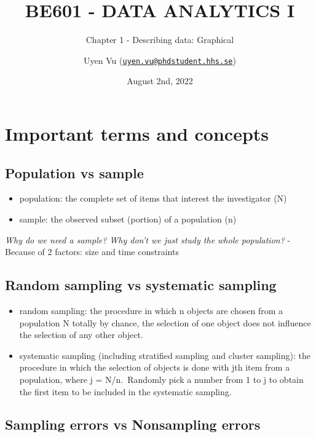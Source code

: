 \documentclass[
]{article}
\title{BE601 - DATA ANALYTICS I}
\subtitle{Chapter 1 - Describing data: Graphical}
\author{Uyen Vu
(\href{mailto:uyen.vu@phdstudent.hhs.se}{\nolinkurl{uyen.vu@phdstudent.hhs.se}})}
\date{August 2nd, 2022}
\providecommand{\tightlist}{%
  \setlength{\itemsep}{0pt}\setlength{\parskip}{0pt}}
\begin{document}
\maketitle

\newpage

\hypertarget{important-terms-and-concepts}{%
\section{Important terms and
concepts}\label{important-terms-and-concepts}}

\hypertarget{population-vs-sample}{%
\subsection{Population vs sample}\label{population-vs-sample}}

\begin{itemize}
\tightlist
\item
  population: the complete set of items that interest the investigator
  (N)
\item
  sample: the observed subset (portion) of a population (n)
\end{itemize}

\emph{Why do we need a sample? Why don't we just study the whole
population?} - Because of 2 factors: size and time constraints

\hypertarget{random-sampling-vs-systematic-sampling}{%
\subsection{Random sampling vs systematic
sampling}\label{random-sampling-vs-systematic-sampling}}

\begin{itemize}
\tightlist
\item
  random sampling: the procedure in which n objects are chosen from a
  population N totally by chance, the selection of one object does not
  influence the selection of any other object.
\item
  systematic sampling (including stratified sampling and cluster
  sampling): the procedure in which the selection of objects is done
  with jth item from a population, where j = N/n.~Randomly pick a number
  from 1 to j to obtain the first item to be included in the systematic
  sampling.
\end{itemize}

\hypertarget{sampling-errors-vs-nonsampling-errors}{%
\subsection{Sampling errors vs Nonsampling
errors}\label{sampling-errors-vs-nonsampling-errors}}
\end{document}
